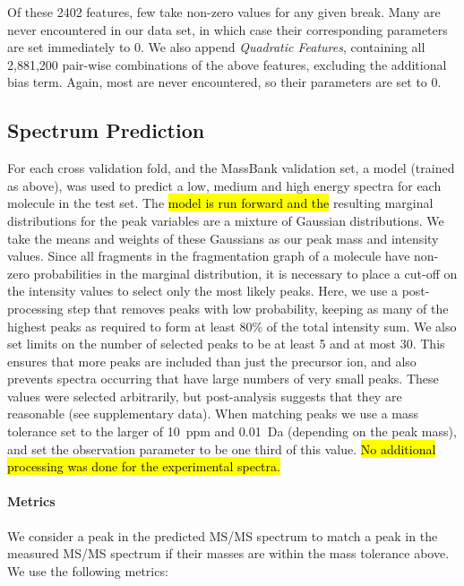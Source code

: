 Of these 2402 features, few take non-zero values for any given break. 
Many are never encountered in our data set, in which case their corresponding parameters are set immediately to 0.
We also append \emph{Quadratic Features}, containing all 2,881,200 pair-wise combinations of the above features, excluding the additional bias term. Again, most are never encountered, so their parameters are set to 0.

\subsection{Spectrum Prediction}
\label{sec:SpectrumPrediction}

For each cross validation fold, and the MassBank validation set, a model (trained as above), was used to predict a low, medium and high energy spectra for each molecule in the test set. 
The \hl{model is run forward and the} resulting marginal distributions for the peak variables are a mixture of Gaussian distributions. 
We take the means and weights of these Gaussians as our peak mass and intensity values. 
Since all fragments in the fragmentation graph of a molecule have non-zero probabilities in the marginal distribution, it is necessary to place a cut-off on the intensity values to select only the most likely peaks. 
Here, we use a post-processing step that removes peaks with low probability, keeping as many of the highest peaks as required to form at least 80\% of the total intensity sum.  
We also set limits on the number of selected peaks to be at least 5 and at most 30. This ensures that more peaks are included than just the precursor ion, and also prevents spectra occurring that have large numbers of very small peaks. These values were selected arbitrarily, but post-analysis suggests that they are reasonable (see supplementary data). 
When matching peaks we use a mass tolerance set to the larger of 10~ppm and 0.01~Da (depending on the peak mass), and set the observation parameter  to be one third of this value.
\hl{No additional processing was done for the experimental spectra.}

\paragraph{Metrics}
We consider a peak in the predicted MS/MS spectrum  to match a peak in the measured MS/MS spectrum  if their masses are within the mass tolerance above.
We use the following metrics:

